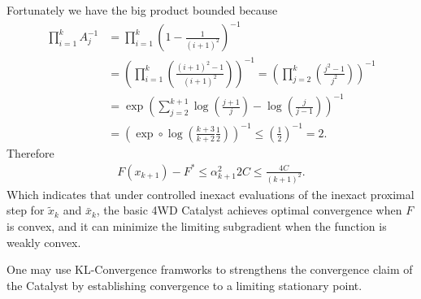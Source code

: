 \documentclass[12pt]{article}
\begin{document}
        Fortunately we have the big product bounded because 
        \begin{align*}
            \prod_{i = 1}^{k} A_{j}^{-1}
            &= 
            \prod_{i = 1}^{k} \left(
                1 - \frac{1}{(i + 1)^2}
            \right)^{-1}
            \\
            &= \left(
                \prod_{i = 1}^{k} \left( \frac{(i + 1)^2 - 1}{(i + 1)^2}\right)
            \right)^{-1} = 
            \left(
                \prod_{j = 2}^{k} 
                \left(
                    \frac{j^2 - 1}{j^2}
                \right)
            \right)^{-1}
            \\
            & = \exp\left(
                \sum_{j = 2}^{k + 1}
                \log\left(
                    \frac{j + 1}{j}
                \right) - \log\left(
                    \frac{j}{j - 1}
                \right)
            \right)^{-1}
            \\
            &= \left(\exp\circ \log
                \left(\frac{k + 3}{k + 2}\frac{1}{2}\right)\right)^{-1} 
            \le \left(
                \frac{1}{2}
            \right)^{-1}= 2. 
        \end{align*}
        Therefore 
        \begin{align*}
            F(x_{k + 1}) - F^* \le \alpha_{k + 1}^2 2C\le \frac{4C}{(k + 1)^2}. 
        \end{align*}
        Which indicates that under controlled inexact evaluations of the inexact proximal step for $\tilde x_k$ and $\bar x_k$, the basic 4WD Catalyst achieves optimal convergence when $F$ is convex, and it can minimize the limiting subgradient when the function is weakly convex. 
        \begin{remark}
            One may use KL-Convergence framworks to strengthens the convergence claim of the Catalyst by establishing convergence to a limiting stationary point. 
        \end{remark}
\end{document}
